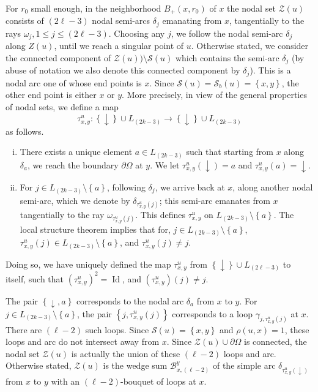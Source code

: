 \documentclass[12pt,a4paper]{amsart}
\theoremstyle{plain} %
\theoremstyle{definition}
\numberwithin{equation}{section}
\numberwithin{figure}{section}
\numberwithin{table}{section}
\newcommand{\cB}{\mathcal{B}}
\newcommand{\cS}{\mathcal{S}}
\newcommand{\cZ}{\mathcal{Z}}
\DeclareMathOperator{\id}{Id}
\newcommand{\sm}{\!\setminus\!}
\newcommand{\set}[1]{\left\lbrace #1 \right\rbrace}
\begin{document}
{For $r_0$ small enough, in the neighborhood $B_{+}(x,r_0)$ of $x$ the nodal set $\cZ(u)$  consists of $(2\ell - 3)$ nodal semi-arcs $\delta_j$ emanating from $x$, tangentially to the rays $\omega_j, 1 \le j \le (2\ell - 3)$. Choosing any $j$, we follow the nodal semi-arc $\delta_j$ along $Z(u)$, until we reach a singular point of $u$. Otherwise stated, we consider the connected component of $\cZ(u)) \sm \cS(u)$ which contains the semi-arc $\delta_j$ (by abuse of notation we also denote this connected component by $\delta_j$). This is a nodal arc one of whose end points is $x$. Since $\cS(u) = \cS_b(u) = \set{x,y}$, the other end point is either $x$ or $y$.
More precisely, in view of the general properties of nodal sets, we define a map
%
\begin{equation}\label{E-hmn-nt}
\tau^{u}_{x,y} : \set{\downarrow} \cup L_{(2k-3)} \to \set{\downarrow} \cup L_{(2k-3)}
\end{equation}
%
as follows.
\begin{enumerate}[(i)]
  \item There exists a unique element $a \in L_{(2k-3)}$ such that starting from $x$ along $\delta_{a}$, we reach the boundary $\partial \Omega$ at $y$. We let $\tau^{u}_{x,y}(\downarrow) = a$ and $\tau^{u}_{x,y}(a) = \downarrow$.
  \item For $j \in L_{(2k-3)}\sm \set{a}$, following $\delta_j$, we arrive back at $x$, along another nodal semi-arc, which we denote by $\delta_{\tau_{x,y}^{u}(j)}$; this semi-arc emanates from $x$ tangentially to the ray $\omega_{\tau_{x,y}^{u}(j)}$. This defines $\tau^{u}_{x,y}$ on $L_{(2k-3)}\sm \set{a}$. The local structure theorem implies that for, $j \in L_{(2k-3)}\sm \set{a}$, $\tau_{x,y}^{u}(j) \in L_{(2k-3)}\sm \set{a}$, and $\tau_{x,y}^{u}(j)\neq j$.
\end{enumerate}

Doing so, we have uniquely defined the map $\tau^{u}_{x,y}$ from $\set{\downarrow} \cup L_{(2\ell-3)}$ to itself, such that $(\tau_{x,y}^{u})^2 = \id$, and  $(\tau_{x,y}^{u})(j) \neq j$.\smallskip

The pair $\set{\downarrow,a}$ corresponds to the nodal arc $\delta_a$ from $x$ to $y$. For $j \in L_{(2k-3)}\sm \set{a}$, the pair $\set{j,\tau_{x,y}^{u}(j)}$ corresponds to a loop $\gamma_{j,\tau_{x,y}^{u}(j)}$ at $x$.  There are $(\ell - 2)$ such loops.  Since $\cS(u) = \set{x,y}$ and $\rho(u,x) = 1$, these loops and arc do not intersect away from $x$. Since $\cZ(u) \cup \partial \Omega$ is connected, the nodal set $\cZ(u)$ is actually the union of these $(\ell - 2)$ loops and arc. Otherwise stated, $\cZ(u)$ is the wedge sum $\cB_{x,(\ell-2)}^{y}$ of the simple arc $\delta_{\tau^{u}_{x,y}(\downarrow)}$ from $x$ to $y$ with an $(\ell-2)$-bouquet of loops at $x$.


}
\end{document}
